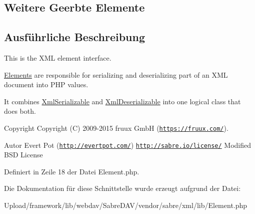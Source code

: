 \subsection*{Weitere Geerbte Elemente}


\subsection{Ausführliche Beschreibung}
This is the X\+ML element interface.

\mbox{\hyperlink{class_sabre_1_1_xml_1_1_element_1_1_elements}{Elements}} are responsible for serializing and deserializing part of an X\+ML document into P\+HP values.

It combines \mbox{\hyperlink{interface_sabre_1_1_xml_1_1_xml_serializable}{Xml\+Serializable}} and \mbox{\hyperlink{interface_sabre_1_1_xml_1_1_xml_deserializable}{Xml\+Deserializable}} into one logical class that does both.

\begin{DoxyCopyright}{Copyright}
Copyright (C) 2009-\/2015 fruux GmbH (\href{https://fruux.com/}{\tt https\+://fruux.\+com/}). 
\end{DoxyCopyright}
\begin{DoxyAuthor}{Autor}
Evert Pot (\href{http://evertpot.com/}{\tt http\+://evertpot.\+com/})  \href{http://sabre.io/license/}{\tt http\+://sabre.\+io/license/} Modified B\+SD License 
\end{DoxyAuthor}


Definiert in Zeile 18 der Datei Element.\+php.



Die Dokumentation für diese Schnittstelle wurde erzeugt aufgrund der Datei\+:\begin{DoxyCompactItemize}
\item 
Upload/framework/lib/webdav/\+Sabre\+D\+A\+V/vendor/sabre/xml/lib/Element.\+php\end{DoxyCompactItemize}
